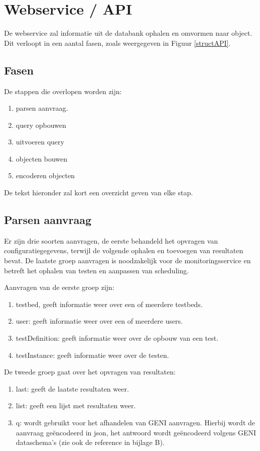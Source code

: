 \section{Webservice / API}
\npar
De webservice zal informatie uit de databank ophalen en omvormen naar object. Dit verloopt in een aantal fasen, zoals weergegeven in Figuur \ref{structAPI}.
\clearpage
\subsection{Fasen}
\npar
De stappen die overlopen worden zijn:
\begin{enumerate}
\item parsen aanvraag.
\item query opbouwen
\item uitvoeren query
\item objecten bouwen
\item encoderen objecten
\end{enumerate}
De tekst hieronder zal kort een overzicht geven van elke stap.
\subsection{Parsen aanvraag}
\npar
Er zijn drie soorten aanvragen, de eerste behandeld het opvragen van configuratiegegevens, terwijl de volgende ophalen en toevoegen van resultaten bevat. De laatste groep aanvragen is noodzakelijk voor de monitoringsservice en betreft het ophalen van testen en aanpassen van scheduling.

\npar
Aanvragen van de eerste groep zijn:
\begin{enumerate}
\item testbed, geeft informatie weer over een of meerdere testbeds.
\item user: geeft informatie weer over een of meerdere users.
\item testDefinition: geeft informatie weer over de opbouw van een test.
\item testInstance: geeft informatie weer over de testen.
\end{enumerate}

De tweede groep gaat over het opvragen van resultaten:
\begin{enumerate}
\item last: geeft de laatste resultaten weer.
\item list: geeft een lijst met resultaten weer.
\item q: wordt gebruikt voor het afhandelen van GENI aanvragen. Hierbij wordt de aanvraag ge\"encodeerd in json, het antwoord wordt ge\"encodeerd volgens GENI dataschema's (zie ook de reference in bijlage B).
\end{enumerate}

